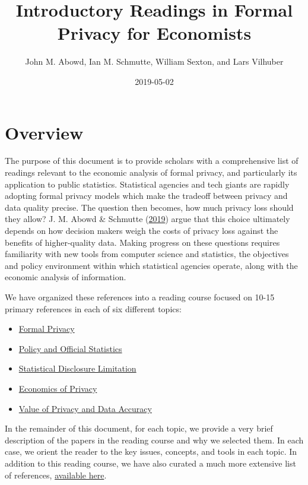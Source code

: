 \documentclass[]{article}
\title{Introductory Readings in Formal Privacy for Economists}
\author{John M. Abowd, Ian M. Schmutte, William Sexton, and Lars Vilhuber}
\date{2019-05-02}
\providecommand{\tightlist}{%
  \setlength{\itemsep}{0pt}\setlength{\parskip}{0pt}}
\begin{document}
\maketitle

{
\setcounter{tocdepth}{1}
\tableofcontents
}
\section{Overview}\label{overview}

The purpose of this document is to provide scholars with a comprehensive
list of readings relevant to the economic analysis of formal privacy,
and particularly its application to public statistics. Statistical
agencies and tech giants are rapidly adopting formal privacy models
which make the tradeoff between privacy and data quality precise. The
question then becomes, how much privacy loss should they allow? J. M.
Abowd \& Schmutte
(\protect\hyperlink{ref-AbowdSchmutte:Privacy:AER}{2019}) argue that
this choice ultimately depends on how decision makers weigh the costs of
privacy loss against the benefits of higher-quality data. Making
progress on these questions requires familiarity with new tools from
computer science and statistics, the objectives and policy environment
within which statistical agencies operate, along with the economic
analysis of information.

We have organized these references into a reading course focused on
10-15 primary references in each of six different topics:

\begin{itemize}
\tightlist
\item
  \protect\hyperlink{formal-privacy}{Formal Privacy}
\item
  \protect\hyperlink{policy-and-official-statistics}{Policy and Official
  Statistics}
\item
  \protect\hyperlink{statistical-disclosure-limitation}{Statistical
  Disclosure Limitation}
\item
  \protect\hyperlink{economics-of-privacy}{Economics of Privacy}
\item
  \protect\hyperlink{value-of-privacy-and-data-accuracy}{Value of
  Privacy and Data Accuracy}
\end{itemize}

In the remainder of this document, for each topic, we provide a very
brief description of the papers in the reading course and why we
selected them. In each case, we orient the reader to the key issues,
concepts, and tools in each topic. In addition to this reading course,
we have also curated a much more extensive list of references,
\href{sloan-privacy-bibliography.pdf}{available here}.
\end{document}
